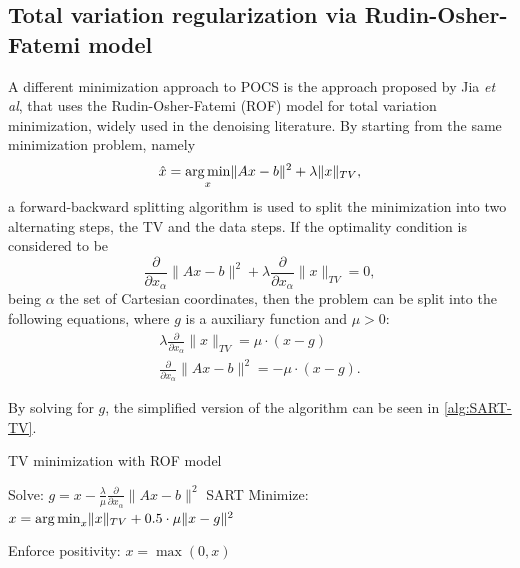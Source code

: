 \subsection{Total variation regularization via Rudin-Osher-Fatemi model} \label{sec:SART-TV}

A different minimization approach to POCS is the approach proposed by Jia \textit{et al}\cite{jia2011gpu}, that uses the Rudin-Osher-Fatemi (ROF) model for total variation minimization, widely used in the denoising literature\cite{RUDIN}\cite{duran2013chambolle}\cite{vogel1996iterative}. By starting from the same minimization problem, namely
\begin{equation}
\hat{x}=\mathop{\mathrm{arg\,min}}_x \lVert Ax-b \rVert^2+\lambda \lVert x\rVert_{TV},
\end{equation}
 a forward-backward splitting algorithm\cite{combettes2005signal} is used to split the minimization into two alternating steps, the TV and the data steps. If the optimality condition is considered to be
\begin{equation}
\frac{\partial}{\partial x_\alpha}\lVert Ax-b \rVert^2+\lambda\frac{\partial}{\partial x_\alpha}\lVert x\rVert_{TV}=0,
\end{equation}
being $\alpha$ the set of Cartesian coordinates, then the problem can be split into the following equations, where $g$ is a auxiliary function and $\mu>0$:
\begin{align}
\lambda\frac{\partial}{\partial x_\alpha}\lVert x\rVert_{TV}=\mu\cdot (x-g)\\
\frac{\partial}{\partial x_\alpha}\lVert Ax-b \rVert^2=-\mu \cdot(x-g).
\end{align}

By solving for $g$, the simplified version of the algorithm can be seen in \ref{alg:SART-TV}.

\begin{algorithm}
\caption{TV minimization with ROF model
\label{alg:SART-TV}}
\begin{algorithmic}[1]
\State Solve: $g=x-\frac{\lambda}{\mu} \frac{\partial}{\partial x_\alpha}\lVert Ax-b \rVert^2$
\Comment SART
\State Minimize: $x=\mathop{\mathrm{arg\,min}}_x  \lVert x\rVert_{TV}+0.5\cdot\mu \lVert x-g \rVert^2$

\State Enforce positivity: $x=\max(0,x) $
\end{algorithmic}

\end{algorithm}

